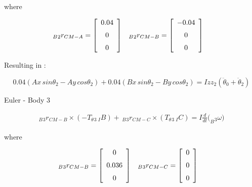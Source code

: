 where

\begin{align*}
_B{_2}{r}_{CM-A} &= \left[ \begin {array}{c} 0.04\\ \noalign{\medskip}0\\ \noalign{\medskip}0
\end {array} \right] &
_B{_2}{r}_{CM-B} &= \left[ \begin {array}{c} -0.04\\ \noalign{\medskip}0\\ \noalign{\medskip}0
\end {array} \right]&
\end{align*}

Resulting in :

\begin{equation}\label{euler2end}
	0.04(Ax\,sin\theta_{{2}} - Ay\, cos\theta_{{2}}) + 0.04(Bx\, sin\theta_{{2}} - By\, cos\theta_{{2}}) = Izz_{{2}}(\ddot\theta_{{0}}+\ddot\theta_{{2}} )
\end{equation}

Euler -  Body 3
 
\begin{equation}\label{euler3}\begin{split}
	_B{_3}{r}_{CM-B}\times (-T_\theta{_3} \, {_I}{B}) + \,_B{_3}{r}_{CM-C} \times (T_\theta{_3} \, {_I}{C}) = I  \frac{d}{dt}(_B{_3}{\omega)}
	\end{split}
\end{equation}
 
 
 
 where

\begin{align*}
_B{_3}{r}_{CM-B} &= \left[ \begin {array}{c} 0\\ \noalign{\medskip}0.036\\ \noalign{\medskip}0
\end {array} \right] &
_B{_3}{r}_{CM-C} &= \left[ \begin {array}{c} 0\\ \noalign{\medskip}0\\ \noalign{\medskip}0
\end {array} \right]
\end{align*}

